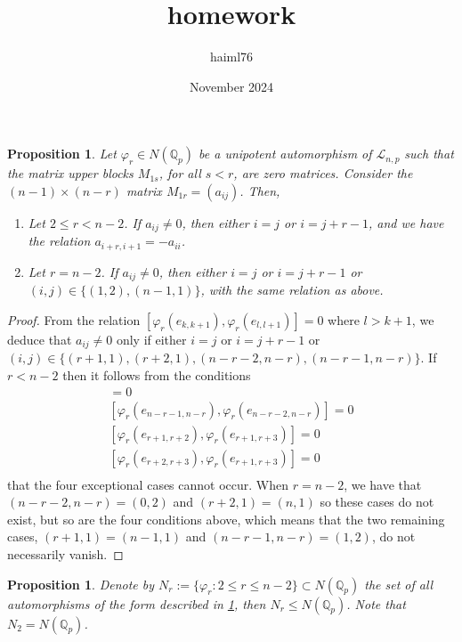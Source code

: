 \documentclass{article}
\title{homework}
\author{haiml76 }
\date{November 2024}
\newtheorem{proposition2}[theorem2]{Proposition}
\begin{document}
\maketitle
\begin{proposition2}
\label{block.1r.structure}
Let $\varphi_{r}\in{N(\mathbb{Q}_{p})}$ be a unipotent automorphism of $\mathcal{L}_{n,p}$ such that the matrix upper blocks $M_{1s}$, for all $s<r$, are zero matrices. Consider the $(n-1)\times{(n-r)}$ matrix $M_{1r}=(a_{ij})$. Then,
\begin{enumerate}
    \item Let $2\leq{r}<{n-2}$. If $a_{ij}\neq{0}$, then either $i=j$ or $i=j+r-1$, and we have the relation $a_{i+r,i+1}=-a_{ii}$.
    \item Let $r=n-2$. If $a_{ij}\neq{0}$, then either $i=j$ or $i=j+r-1$ or $(i,j)\in\{(1,2),(n-1,1)\}$, with the same relation as above.
\end{enumerate}
\end{proposition2}
\begin{proof}
From the relation $[\varphi_{r}(e_{k,k+1}),\varphi_{r}(e_{l,l+1})]=0$ where $l>k+1$, we deduce that $a_{ij}\neq{0}$ only if either $i=j$ or $i=j+r-1$ or\\ $(i,j)\in\{(r+1,1),(r+2,1),(n-r-2,n-r),(n-r-1,n-r)\}$. If $r<n-2$ then it follows from the conditions
\begin{align*}
[\varphi_{r}(e_{n-r-2,n-r-1}),\varphi_{r}(e_{n-r-2,n-r})]=0\\
[\varphi_{r}(e_{n-r-1,n-r}),\varphi_{r}(e_{n-r-2,n-r})]=0\\
[\varphi_{r}(e_{r+1,r+2}),\varphi_{r}(e_{r+1,r+3})]=0\\
[\varphi_{r}(e_{r+2,r+3}),\varphi_{r}(e_{r+1,r+3})]=0\\
\end{align*}
that the four exceptional cases cannot occur. When $r=n-2$, we have that $(n-r-2,n-r)=(0,2)$ and $(r+2,1)=(n,1)$ so these cases do not exist, but so are the four conditions above, which means that the two remaining cases, $(r+1,1)=(n-1,1)$ and $(n-r-1,n-r)=(1,2)$, do not necessarily vanish.
\end{proof}
\begin{proposition2}
Denote by $N_{r}:=\{\varphi_{r} : 2\leq{r}\leq{n-2}\}\subset{N(\mathbb{Q}_{p})}$ the set of all automorphisms of the form described in \ref{block.1r.structure}, then $N_{r}\leq{N(\mathbb{Q}_{p})}$. Note that $N_2=N(\mathbb{Q}_{p})$.
\end{proposition2}
\end{document}
